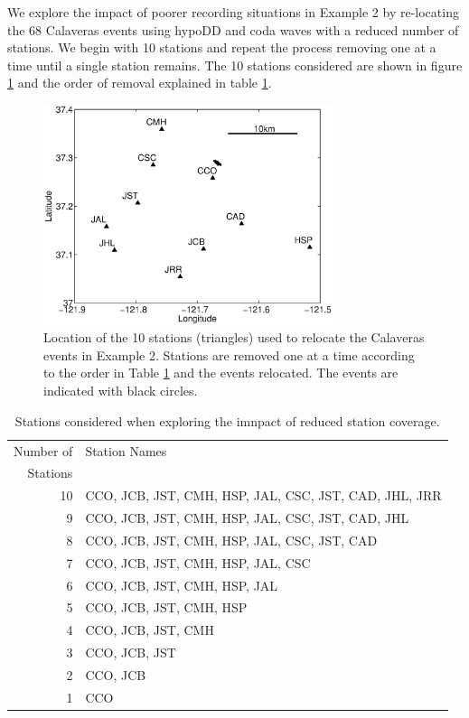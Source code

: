 \documentclass[extra]{gji}
\begin{document}
We explore the impact of poorer recording situations in Example 2 by
re-locating the 68 Calaveras events  using hypoDD and coda waves
with a reduced number of stations. We begin with 10 stations and
repeat the process removing one at a time until a single station
remains. The 10 stations considered are shown in figure
\ref{fig:-eqopti-Calaveras-substations} and the order of removal
explained in table \ref{tab:Calaveras-stationremoval}.


\begin{figure}
\noindent\includegraphics[width =
20pc]{diags/CalaverasMap/matlab/Calaveras_substationmap}
\caption{Location of the 10 stations (triangles) used to relocate
the Calaveras events in Example 2. Stations are removed one at a
time according to the order in Table
\ref{tab:Calaveras-stationremoval} and the events relocated. The
events are indicated with black circles.}
\label{fig:-eqopti-Calaveras-substations}
\end{figure}

\begin{table}
\caption{Stations considered when exploring the imnpact of reduced
station coverage.} \label{tab:Calaveras-stationremoval}
\begin{tabular}{|r|l|}
\hline
Number of & Station Names\\
Stations  & \\
\hline
10 & CCO, JCB, JST, CMH, HSP, JAL, CSC, JST, CAD, JHL, JRR\\
9  & CCO, JCB, JST, CMH, HSP, JAL, CSC, JST, CAD, JHL\\
8  & CCO, JCB, JST, CMH, HSP, JAL, CSC, JST, CAD\\
7  & CCO, JCB, JST, CMH, HSP, JAL, CSC \\
6  & CCO, JCB, JST, CMH, HSP, JAL \\
5  & CCO, JCB, JST, CMH, HSP \\
4  & CCO, JCB, JST, CMH \\
3  & CCO, JCB, JST \\
2  & CCO, JCB \\
1  & CCO \\
\hline
\end{tabular}
\end{table}
\end{document}
